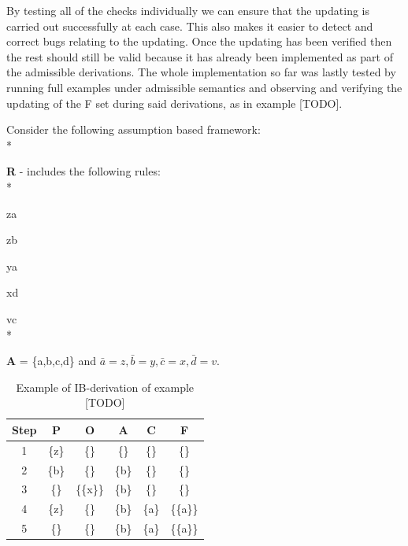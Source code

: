 By testing all of the checks individually we can ensure that the updating is carried out successfully at each case. This also makes it easier to detect and correct bugs relating to the updating. Once the updating has been verified then the rest should still be valid because it has already been implemented as part of the admissible derivations. The whole implementation so far was lastly tested by running full examples under admissible semantics and observing and verifying the updating of the F set during said derivations, as in example [TODO].

\begin{framed}
\begin{exmp} Consider the following assumption based framework:
\\*

\noindent\textbf{R} - includes the following rules:
\\*

\indent	z\textleftarrow a

\indent z\textleftarrow b

\indent y\textleftarrow a

\indent x\textleftarrow d

\indent v\textleftarrow c
\\*

\noindent\textbf{A} = \{a,b,c,d\} and $\bar{a} = z, \bar{b} = y, \bar{c} = x, \bar{d} = v$.

\end{exmp}
\end{framed}

\begin{table}[h]
  \begin{center}
    \begin{tabular}{cccccc}
    \hline
    Step & P     & O         & A     & C     & F         \\ \hline
    1    & \{z\} & \{\}      & \{\}  & \{\}  & \{\}      \\
    2    & \{b\} & \{\}      & \{b\} & \{\}  & \{\}      \\
    3    & \{\}  & \{\{x\}\} & \{b\} & \{\}  & \{\}      \\
    4    & \{z\} & \{\}      & \{b\} & \{a\} & \{\{a\}\} \\
    5    & \{\}  & \{\}      & \{b\} & \{a\} & \{\{a\}\} \\
    \end{tabular}
    \caption {Example of IB-derivation of example [TODO]}
  \end{center}
\end{table}

